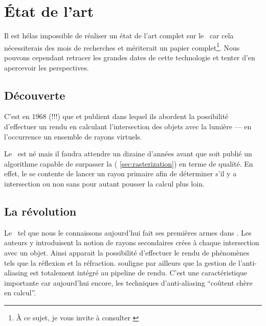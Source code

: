 \chapter{État de l'art\label{sec:state_of_the_art}}
Il est hélas impossible de réaliser un état de l'art complet sur le
\raytracing{}\ car cela nécessiterais des mois de recherches et mériterait un
papier complet\footnote{À ce sujet, je vous invite à consulter
\cite{Wald01stateof}}. Nous pouvons cependant retracer les grandes dates de
cette technologie et tenter d'en apercevoir les perspectives. 


\section{Découverte} 
C'est en 1968 (!!!) que  et  publient
\cite{Lafortune93} dans lequel ils abordent la possibilité d'effectuer un
rendu en calculant l'intersection des objets avec la lumière --- en
l'occurrence un ensemble de rayons virtuels. 

Le \ est né mais il faudra attendre un dizaine d'années avant
que soit publié un algorithme capable de surpasser la  (\cf
\ref{sec:rasterization}) en terme de qualité. En effet, le 
se contente de lancer un rayon primaire afin de déterminer s'il y a
intersection ou non sans pour autant pousser la calcul plus loin.

\section{La révolution}
Le \raytracing{}\ tel que nous le connaissons aujourd'hui fait ses premières
armes dans \cite{Whitted1980}. Les auteurs y introduisent la notion de rayons
secondaires crées à chaque intersection avec un objet. Ainsi apparait la
possibilité d'effectuer le rendu de phénomènes tels que la réflexion et la
réfraction.  souligne par ailleurs que la gestion de
l'anti-aliasing est totalement intégré au pipeline de rendu. C'est une
caractéristique importante car aujourd'hui encore, les techniques
d'anti-aliasing ``coûtent chère en calcul''.

